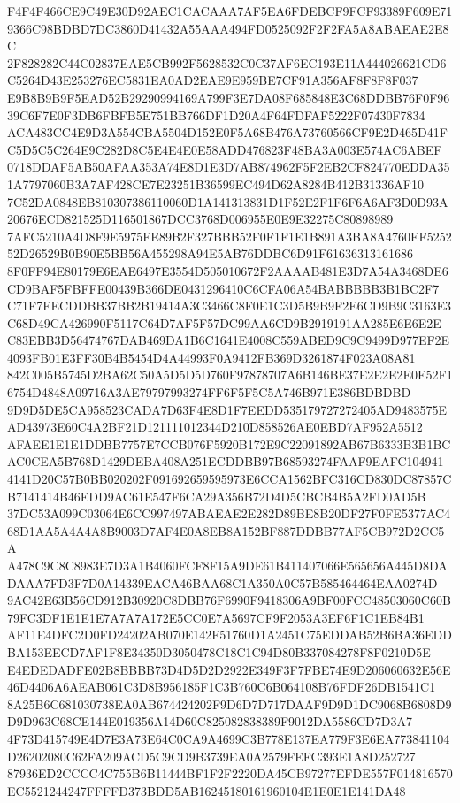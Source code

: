 \documentclass[UTF8,fontset=fandol,zihao=-4,a4paper]{ctexart}
\begin{document}
{{F4F4F466CE9C49E30D92AEC1CACAAA7AF5EA6FDEBCF9FCF93389F609E719366C98BDBD7DC3860D41432A55AAA494FD0525092F2F2FA5A8ABAEAE2E8C
2F828282C44C02837EAE5CB992F5628532C0C37AF6EC193E11A444026621CD6C5264D43E253276EC5831EA0AD2EAE9E959BE7CF91A356AF8F8F8F037
E9B8B9B9F5EAD52B29290994169A799F3E7DA08F685848E3C68DDBB76F0F9639C6F7E0F3DB6FBFB5E751BB766DF1D20A4F64FDFAF5222F07430F7834
ACA483CC4E9D3A554CBA5504D152E0F5A68B476A73760566CF9E2D465D41FC5D5C5C264E9C282D8C5E4E4E0E58ADD476823F48BA3A003E574AC6ABEF
0718DDAF5AB50AFAA353A74E8D1E3D7AB874962F5F2EB2CF824770EDDA351A7797060B3A7AF428CE7E23251B36599EC494D62A8284B412B31336AF10
7C52DA0848EB810307386110060D1A141313831D1F52E2F1F6F6A6AF3D0D93A20676ECD821525D116501867DCC3768D006955E0E9E32275C80898989
7AFC5210A4D8F9E5975FE89B2F327BBB52F0F1F1E1B891A3BA8A4760EF525252D26529B0B90E5BB56A455298A94E5AB76DDBC6D91F61636313161686
8F0FF94E80179E6EAE6497E3554D505010672F2AAAAB481E3D7A54A3468DE6CD9BAF5FBFFE00439B366DE0431296410C6CFA06A54BABBBBB3B1BC2F7
C71F7FECDDBB37BB2B19414A3C3466C8F0E1C3D5B9B9F2E6CD9B9C3163E3C68D49CA426990F5117C64D7AF5F57DC99AA6CD9B2919191AA285E6E6E2E
C83EBB3D56474767DAB469DA1B6C1641E4008C559ABED9C9C9499D977EF2E4093FB01E3FF30B4B5454D4A44993F0A9412FB369D3261874F023A08A81
842C005B5745D2BA62C50A5D5D5D760F97878707A6B146BE37E2E2E2E0E52F16754D4848A09716A3AE79797993274FF6F5F5C5A746B971E386BDBDBD
9D9D5DE5CA958523CADA7D63F4E8D1F7EEDD535179727272405AD9483575EAD43973E60C4A2BF21D121111012344D210D858526AE0EBD7AF952A5512
AFAEE1E1E1DDBB7757E7CCB076F5920B172E9C22091892AB67B6333B3B1BCAC0CEA5B768D1429DEBA408A251ECDDBB97B68593274FAAF9EAFC104941
4141D20C57B0BB020202F091692659595973E6CCA1562BFC316CD830DC87857CB7141414B46EDD9AC61E547F6CA29A356B72D4D5CBCB4B5A2FD0AD5B
37DC53A099C03064E6CC997497ABAEAE2E282D89BE8B20DF27F0FE5377AC468D1AA5A4A4A8B9003D7AF4E0A8EB8A152BF887DDBB77AF5CB972D2CC5A
A478C9C8C8983E7D3A1B4060FCF8F15A9DE61B411407066E565656A445D8DADAAA7FD3F7D0A14339EACA46BAA68C1A350A0C57B585464464EAA0274D
9AC42E63B56CD912B30920C8DBB76F6990F9418306A9BF00FCC48503060C60B79FC3DF1E1E1E7A7A7A172E5CC0E7A5697CF9F2053A3EF6F1C1EB84B1
AF11E4DFC2D0FD24202AB070E142F51760D1A2451C75EDDAB52B6BA36EDDBA153EECD7AF1F8E34350D3050478C18C1C94D80B337084278F8F0210D5E
E4EDEDADFE02B8BBBB73D4D5D2D2922E349F3F7FBE74E9D206060632E56E46D4406A6AEAB061C3D8B956185F1C3B760C6B064108B76FDF26DB1541C1
8A25B6C681030738EA0AB674424202F9D6D7D717DAAF9D9D1DC9068B6808D9D9D963C68CE144E019356A14D60C825082838389F9012DA5586CD7D3A7
4F73D415749E4D7E3A73E64C0CA9A4699C3B778E137EA779F3E6EA773841104D26202080C62FA209ACD5C9CD9B3739EA0A2579FEFC393E1A8D252727
87936ED2CCCC4C755B6B11444BF1F2F2220DA45CB97277EFDE557F014816570EC5521244247FFFFD373BDD5AB16245180161960104E1E0E1E141DA48
}}
\end{document}
